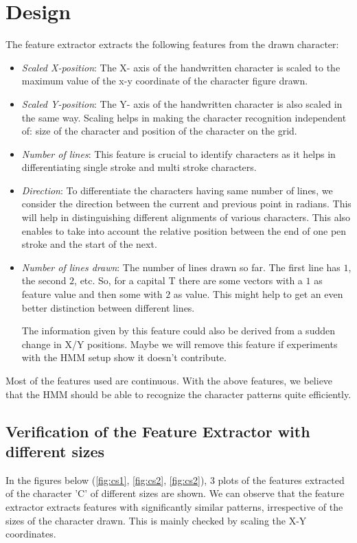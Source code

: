 \section{Design}
The feature extractor extracts the following features from the drawn character:
\begin{itemize}
\item \textit{Scaled X-position}:
The X- axis of the handwritten character is scaled to the maximum value of the x-y coordinate of the character figure drawn.
 
\item \textit{Scaled Y-position}:
The Y- axis of the handwritten character is also scaled in the same way. Scaling helps in making the character recognition independent of: size of the character and position of the character on the grid.

\item \textit{Number of lines}:
This feature is crucial to identify characters as it helps in differentiating single stroke and multi stroke characters.
 
\item \textit{Direction}:
To differentiate the characters having same number of lines, we consider the direction between the current and previous point in radians. This will help in distinguishing different alignments of various characters. This also enables to take into account the relative position between the end of one pen stroke and the start of the next.

\item \textit{Number of lines drawn}:
The number of lines drawn so far. The first line has $1$, the second $2$, etc. So, for a capital T there are some vectors with a $1$ as feature value and then some with $2$ as value. This might help to get an even better distinction between different lines.

The information given by this feature could also be derived from a sudden change in X/Y positions. Maybe we will remove this feature if experiments with the HMM setup show it doesn't contribute.
\end{itemize}
 
Most of the features used are continuous. With the above features, we believe that the HMM should be able to recognize the character patterns quite efficiently.
 
\subsection{Verification of the Feature Extractor with different sizes}
In the figures below (\ref{fig:cs1}, \ref{fig:cs2}, \ref{fig:cs2}), 3 plots of the features extracted of the character 'C' of different sizes are shown. We can observe that the feature extractor extracts features with significantly similar patterns, irrespective of the sizes of the character drawn. This is mainly checked by scaling the X-Y coordinates.
 
